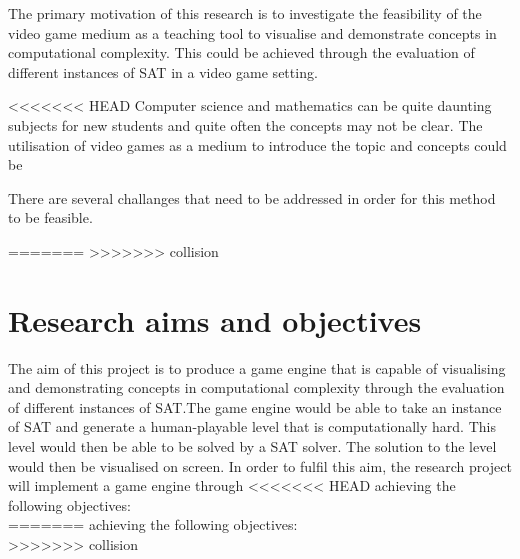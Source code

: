 \documentclass[11pt, a4paper, oneside]{report} %
\begin{document}
The primary motivation of this research is to investigate the feasibility of the
video game medium as a teaching tool to visualise and demonstrate concepts in
computational complexity. This could be achieved through the evaluation of
different instances of SAT in a video game setting.\@

<<<<<<< HEAD
Computer science and mathematics can be quite daunting subjects for new students
and quite often the concepts may not be clear. The utilisation of video games as
a medium to introduce the topic and concepts could be

There are several challanges that need to be addressed in order for this method
to be feasible.

=======
>>>>>>> collision

\section{Research aims and objectives}


The aim of this project is to produce a game engine that is capable of
visualising and demonstrating concepts in computational complexity through the
evaluation of different instances of SAT.\@ The game engine would be able to
take an instance of SAT and generate a human-playable level that is
computationally hard. This level would then be able to be solved by a SAT
solver. The solution to the level would then be visualised on screen. In order
to fulfil this aim, the research project will implement a game engine through
<<<<<<< HEAD
achieving the following objectives: \\
=======
achieving the following objectives: \\ 
>>>>>>> collision
\end{document}
